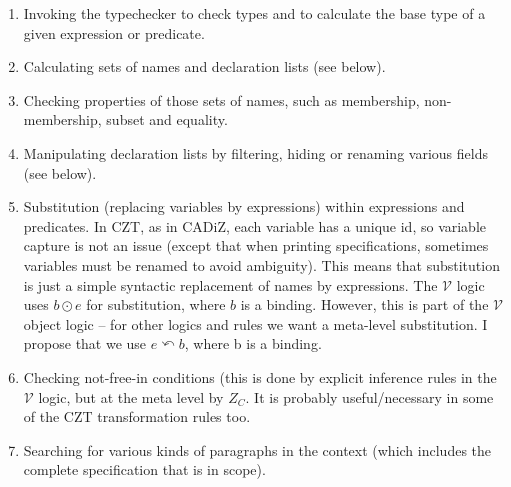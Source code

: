 \documentclass{article}
\newcommand{\V}{\mathcal{V}}
\newcommand{\substitute}{\mathrel{\curvearrowleft}}  %
\begin{document}
\begin{enumerate}
\item Invoking the typechecker to check types and to calculate
  the base type of a given expression or predicate.
\item Calculating sets of names and declaration lists (see below).
\item Checking properties of those sets of names, such as membership,
  non-membership, subset and equality.
\item Manipulating declaration lists by filtering, hiding
  or renaming various fields (see below).
\item Substitution (replacing variables by expressions)
  within expressions and predicates.  In CZT, as in CADiZ,
  each variable has a unique id, so variable capture is not an 
  issue (except that when printing specifications, sometimes
  variables must be renamed to avoid ambiguity).  This means that
  substitution is just a simple syntactic replacement of names
  by expressions.  The $\V$ logic uses $b \odot e$ for substitution,
  where $b$ is a binding.  However, this is part of the $\V$ object
  logic -- for other logics and rules we want a meta-level substitution.
  I propose that we use $e \substitute b$, where b is a binding.
\item Checking not-free-in conditions (this is done by explicit
  inference rules in the $\V$ logic, but at the meta level by $Z_C$.
  It is probably useful/necessary in some of the CZT transformation
  rules too.
\item Searching for various kinds of paragraphs in the context
  (which includes the complete specification that is in scope).
\end{enumerate}
\end{document}
